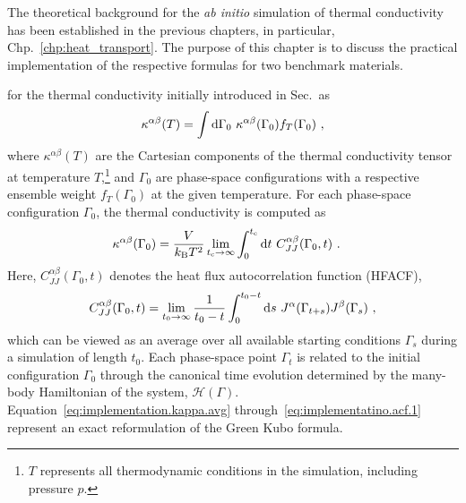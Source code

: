 
\label{chp:implementation}
\newcommand{\tcut}{t_{\rm c}}
\newcommand{\teff}{t^{\rm eff}_0}

The theoretical background for the \emph{ab initio} simulation of thermal conductivity has been established in the previous chapters, in particular, Chp.~\ref{chp:heat_transport}. The purpose of this chapter is to discuss the practical implementation of the respective formulas for two benchmark materials. 

 for the thermal conductivity initially introduced in Sec.\, as
\begin{align}
	\kappa^{\alpha \beta} (T)
		= \int \d \Gamma_0 ~ \kappa^{\alpha \beta} (\Gamma_0) f_T (\Gamma_0) ~,
	\label{eq:implementation.kappa.avg}
\end{align}
where $\kappa^{\alpha \beta} (T)$ are the Cartesian components of the thermal conductivity tensor at temperature $T$,\footnote{$T$ represents all thermodynamic conditions in the simulation, including pressure $p$.} and $\Gamma_0$ are phase-space configurations with a respective ensemble weight $f_T (\Gamma_0)$ at the given temperature. For each phase-space configuration $\Gamma_0$, the thermal conductivity is computed as
\begin{align}
	\kappa^{\alpha \beta} (\Gamma_0)
		&=
		\frac{V}{k_{\rm B} T^2} 
		\lim_{t_{\rm c} \to \infty}
		\int_{0}^{\tcut} 
		\d t ~ C_{JJ}^{\alpha \beta} (\Gamma_0, t)~.
	\label{eq:implementatino.kappa.1}
\end{align}
Here, $	C^{\alpha \beta}_{J J} (\Gamma_0, t)$ denotes the heat flux autocorrelation function (HFACF),
\begin{align}
	C^{\alpha \beta}_{J J} (\Gamma_0, t)
		=
		\lim_{t_{0} \to \infty}
		\frac{1}{t_0 - t}
		\int_{0}^{t_{\rm 0} - t} 
		\d s ~ J^\alpha (\Gamma_{t + s}) J^\beta (\Gamma_s)~,
	\label{eq:implementatino.acf.1}
\end{align}
which can be viewed as an average over all available starting conditions $\Gamma_s$ during a simulation of length $t_0$. Each phase-space point $\Gamma_t$ is related to the initial configuration $\Gamma_0$ through the canonical time evolution determined by the many-body Hamiltonian of the system, $\mathcal H (\Gamma)$. Equation~\eqref{eq:implementation.kappa.avg} through~\eqref{eq:implementatino.acf.1} represent an exact reformulation of the Green Kubo formula.


